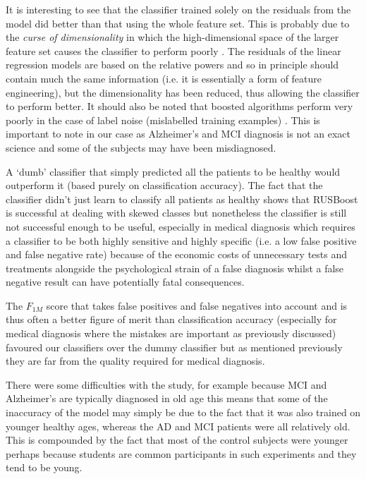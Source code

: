 It is interesting to see that the classifier trained solely on the residuals from the model did better than that using the whole feature set. This is probably due to the \textit{curse of dimensionality} in which the high-dimensional space of the larger feature set causes the classifier to perform poorly \cite{Witten2011}. The residuals of the linear regression models are based on the relative powers and so in principle should contain much the same information (i.e. it is essentially a form of feature engineering), but the dimensionality has been reduced, thus allowing the classifier to perform better. It should also be noted that boosted algorithms perform very poorly in the case of label noise (mislabelled training examples) \cite{Long2009}. This is important to note in our case as Alzheimer's and MCI diagnosis is not an exact science and some of the subjects may have been misdiagnosed.

A `dumb' classifier that simply predicted all the patients to be healthy would outperform it (based purely on classification accuracy). The fact that the classifier didn't just learn to classify all patients as healthy shows that RUSBoost is successful at dealing with skewed classes but nonetheless the classifier is still not successful enough to be useful, especially in medical diagnosis which requires a classifier to be both highly sensitive and highly specific (i.e. a low false positive and false negative rate) because of the economic costs of unnecessary tests and treatments alongside the psychological strain of a false diagnosis whilst a false negative result can have potentially fatal consequences.

The $F_{1M}$ score that takes false positives and false negatives into account and is thus often a better figure of merit than classification accuracy (especially for medical diagnosis where the mistakes are important as previously discussed) favoured our classifiers over the dummy classifier but as mentioned previously they are far from the quality required for medical diagnosis.

There were some difficulties with the study, for example because MCI and Alzheimer's are typically diagnosed in old age this means that some of the inaccuracy of the model may simply be due to the fact that it was also trained on younger healthy ages, whereas the AD and MCI patients were all relatively old. This is compounded by the fact that most of the control subjects were younger perhaps because students are common participants in such experiments and they tend to be young.

